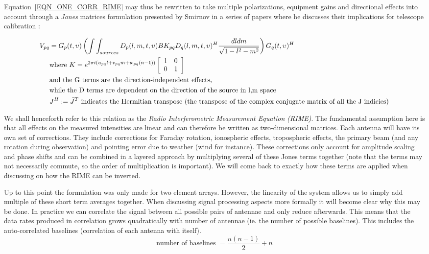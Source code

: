 \documentclass[a4paper,10pt]{report}
\begin{document}
Equation~\ref{EQN_ONE_CORR_RIME} may thus be rewritten to take multiple polarizations, equipment gains and directional effects into account through a \textit{Jones} matrices 
formulation presented by Smirnov in a series of papers where he discusses their implications for telescope calibration \cite{2011A&A...527A.106S,2011A&A...527A.107S,2011A&A...527A.108S,2011A&A...531A.159S}:

\begin{equation}
\label{eqn_RIME}
\begin{split}
    V_{pq} &= G_p(t,\upsilon)\left(\int\int_{sources}D_p(l,m,t,\upsilon)BK_{pq}D_q(l,m,t,\upsilon)^H\frac{dldm}{\sqrt{1-l^2-m^2}}\right)G_q(t,\upsilon)^H\\
	  &\text{where }K = e^{2\pi i(u_{pq}l+v_{pq}m+w_{pq}(n-1))}
    \left[\begin{array}{c c}
     1 & 0 \\
     0 & 1 \\
    \end{array}\right]\\
	 &\text{and the G terms are the direction-independent effects,}\\
 	 &\text{while the D terms are dependent on the direction of the source in l,m space}\\
 	 &J^H:=\bar J^T \text{ indicates the Hermitian transpose (the transpose of the complex conjugate matrix of all the J indicies)}\\ 
\end{split}
\end{equation}

We shall henceforth refer to this relation as the \textit{Radio Interferometric Measurement Equation (RIME)}. 
The fundamental assumption here is that all effects on the measured intensities are linear and can therefore be 
written as two-dimensional matrices. Each antenna will have its own set of corrections. They 
include corrections for Faraday rotation, ionospheric effects, tropospheric effects, the primary beam (and any rotation during
observation) and pointing error due to weather (wind for instance). These corrections only account for amplitude scaling and 
phase shifts and can be combined in a layered approach by multiplying several of these Jones terms together (note that the terms 
may not necessarily commute, so the order of multiplication is important). We will come back to exactly how these terms are applied
when discussing on how the RIME can be inverted.

Up to this point the formulation was only made for two element arrays. However, the linearity of the system allows us
to simply add multiple of these short term averages together. When discussing signal processing aspects more formally
it will become clear why this may be done. In practice we can correlate the signal between all possible pairs of 
antennae and only reduce afterwards. This means that the data rates produced in correlation grows quadratically with 
number of antennae (ie. the number of possible baselines). This includes the auto-correlated baselines (correlation 
of each antenna with itself).
\begin{equation}
  \text{number of baselines } = \frac{n(n-1)}{2} + n
\end{equation}
\end{document}
